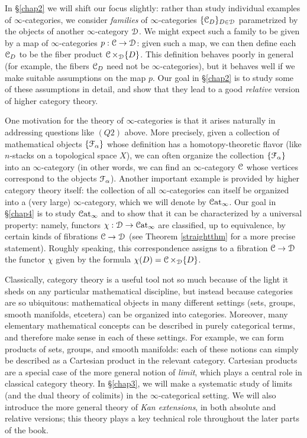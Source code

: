 In \S \ref{chap2} we will shift our focus slightly: rather than study individual examples of $\infty$-categories, we consider {\em families} of $\infty$-categories $\{ \operatorname{\mathcal{C}}_{D} \}_{ D \in \operatorname{\mathcal{D}}}$ parametrized by the objects of another $\infty$-category $\operatorname{\mathcal{D}}$. We might expect such a family to be given by a map of $\infty$-categories $p: \operatorname{\mathcal{C}} \rightarrow \operatorname{\mathcal{D}}$: given such a map, we can then define each $\operatorname{\mathcal{C}}_{D}$ to be
the fiber product $\operatorname{\mathcal{C}} \times_{\operatorname{\mathcal{D}}} \{D\}$. This definition behaves poorly in general
(for example, the fibers $\operatorname{\mathcal{C}}_{D}$ need not be $\infty$-categories), but it behaves well if
we make suitable assumptions on the map $p$. Our goal in \S \ref{chap2} is to study some of these assumptions in detail, and show that they lead to a good {\em relative} version of higher category theory.

One motivation for the theory of $\infty$-categories is that it arises naturally in addressing questions like $(Q2)$ above. More precisely, given a collection of mathematical objects $\{ \operatorname{\mathcal{F}}_{\alpha} \}$ whose definition has a homotopy-theoretic flavor (like $n$-stacks on a topological space $X$), we can often organize the collection $\{ \operatorname{\mathcal{F}}_{\alpha} \}$ into an $\infty$-category
(in other words, we can find an $\infty$-category $\operatorname{\mathcal{C}}$ whose vertices correspond to the
objects $\operatorname{\mathcal{F}}_{\alpha}$). Another important example is provided by higher category theory itself: 
the collection of all $\infty$-categories can itself be organized into a (very large) $\infty$-category, which we will denote by $\operatorname{\mathcal{C}at}_{\infty}$. Our goal in \S \ref{chap4} is to study $\operatorname{\mathcal{C}at}_{\infty}$ and to show that it can be characterized by a universal property: namely, functors $\chi: \operatorname{\mathcal{D}} \rightarrow \operatorname{\mathcal{C}at}_{\infty}$ are classified, up to equivalence, by certain kinds of fibrations $\operatorname{\mathcal{C}} \rightarrow \operatorname{\mathcal{D}}$ (see Theorem \ref{straightthm} for a more precise statement). Roughly speaking, this correspondence assigns to a fibration
$\operatorname{\mathcal{C}} \rightarrow \operatorname{\mathcal{D}}$ the functor $\chi$ given by the formula $\chi(D) = \operatorname{\mathcal{C}} \times_{\operatorname{\mathcal{D}}} \{D\}$. 

Classically, category theory is a useful tool not so much because of the light it sheds on any particular
mathematical discipline, but instead because categories are so ubiquitous:
mathematical objects in many different settings (sets, groups, smooth manifolds, etcetera) can be organized into categories. Moreover, many elementary mathematical concepts can be described in purely categorical terms, and therefore make sense in each of these settings. For example, we can form products of sets, groups, and smooth manifolds: each of these notions can simply be described as a Cartesian product in the relevant category. Cartesian products are a special case of the more general notion of {\em limit}, which plays a central role in classical category theory. In \S \ref{chap3}, we will make a systematic study of limits (and the dual theory of colimits) in the $\infty$-categorical setting. We will also introduce the more general theory of {\em Kan extensions}, in both absolute and relative versions; this theory plays a key technical role throughout the later parts of the book.

